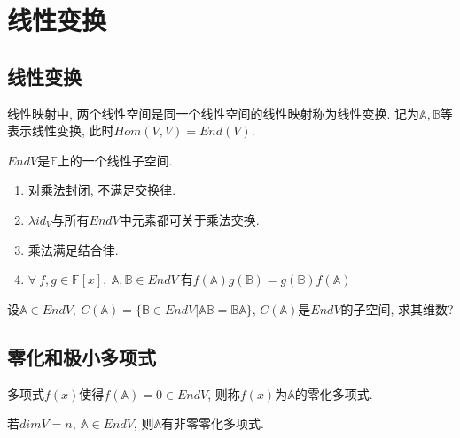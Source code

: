 \chapter{ 线性变换 }

\section{ 线性变换 }

 \begin{definition}[线性变换]
     线性映射中, 两个线性空间是同一个线性空间的线性映射称为线性变换.
     记为$\mathbb{A}, \mathbb{B}$等表示线性变换, 此时$Hom(V,V)=End(V)$.
 \end{definition}

\begin{statement}
    $EndV$是$\mathbb{F}$上的一个线性子空间.
\end{statement}

\begin{statement}
    \par
    \begin{enumerate}[itemindent=1em]
        \item 对乘法封闭, 不满足交换律.
        \item $\lambda id_V$与所有$EndV$中元素都可关于乘法交换.
        \item 乘法满足结合律.
        \item $\forall \ f, g\in \mathbb{F}[x], \ \mathbb{A}, \mathbb{B}\in EndV\ $有$f(\mathbb{A})g(\mathbb{B})=g(\mathbb{B})f(\mathbb{A})$
    \end{enumerate}
\end{statement}

\begin{example}
    设$\mathbb{A}\in EndV, \ C(\mathbb{A})=\{\mathbb{B}\in EndV|\mathbb{A}\mathbb{B}=\mathbb{B}\mathbb{A}\}$, $C(\mathbb{A})$是$EndV$的子空间, 求其维数?
\end{example}

\section{ 零化和极小多项式 }

\begin{definition}[零化多项式]
    多项式$f(x)$使得$f(\mathbb{A})=0\in EndV$, 则称$f(x)$为$\mathbb{A}$的零化多项式.
\end{definition}

\begin{lemma}
    若$dimV=n, \ \mathbb{A}\in EndV$, 则$\mathbb{A}$有非零零化多项式.
\end{lemma}

